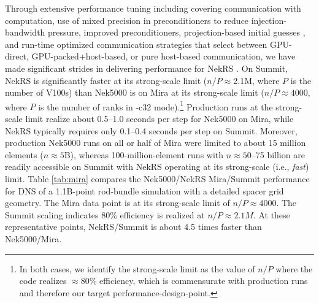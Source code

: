Through extensive performance tuning including covering communication with
computation, use of mixed precision in preconditioners to reduce
injection-bandwidth pressure, improved preconditioners, projection-based
initial guesses \cite{fisc98}, and run-time optimized
communication strategies that select between GPU-direct, GPU-packed+host-based,
or pure host-based communication, we have made significant strides in delivering
performance for NekRS \cite{nekrs}.  On Summit, NekRS is significantly faster at
its strong-scale limit ($n/P \approx $2.1M, where $P$ is the number of V100s)
than Nek5000 is on Mira at its strong-scale limit ($n/P \approx 4000$, where $P$
is the number of ranks in -c32 mode).\footnote{In both cases, we identify the
strong-scale limit as the value of $n/P$ where the code realizes $\approx$80\%
efficiency, which is commensurate with production runs and therefore our target
performance-design-point.}  Production runs at the strong-scale limit realize
about 0.5--1.0 seconds per step for Nek5000 on Mira, while NekRS typically
requires only 0.1--0.4 seconds per step on Summit.  Moreover, production
Nek5000 runs on all or half of Mira were limited to about 15 million elements
($n \approx 5$B), whereas 100-million-element runs with $n \approx 50$--75
billion are readily accessible on Summit with NekRS operating at its
strong-scale (i.e., {\em fast}) limit.
Table \ref{tab:mira} compares the Nek5000/NekRS Mira/Summit
performance for DNS of a 1.1B-point rod-bundle simulation with a detailed
spacer grid geometry.  The Mira data point is at its strong-scale limit
of $n/P \approx 4000$.  The Summit scaling indicates 80\%
efficiency is realized at $n/P \approx 2.1M$.  At these representative
points, NekRS/Summit is about 4.5 times faster than Nek5000/Mira. \\



